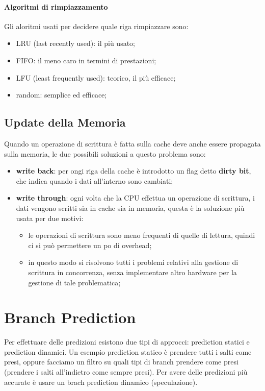 \documentclass[12pt]{article}
\begin{document}
\paragraph{Algoritmi di rimpiazzamento}
Gli aloritmi usati per decidere quale riga rimpiazzare sono:
\begin{itemize}
    \item LRU (last recently used): il pi\`u usato;
    \item FIFO: il meno caro in termini di prestazioni;
    \item LFU (least frequently used): teorico, il pi\`u efficace;
    \item random: semplice ed efficace;
\end{itemize}

\subsection{Update della Memoria}
Quando un operazione di scrittura \`e fatta sulla cache deve anche essere propagata sulla memoria, le due possibili soluzioni a questo problema sono:
\begin{itemize}
    \item \textbf{write back}: per ongi riga della cache \`e introdotto un flag detto \textbf{dirty bit}, che indica quando i dati all'interno sono cambiati;
    \item \textbf{write through}: ogni volta che la CPU effettua un operazione di scrittura, i dati vengono scritti sia in cache sia in memoria, questa \`e la soluzione pi\`u usata per due motivi:
        \begin{itemize}
            \item le operazioni di scrittura sono meno frequenti di quelle di lettura, quindi ci si pu\`o permettere un po di overhead;
            \item in questo modo si risolvono tutti i problemi relativi alla gestione di scrittura in concorrenza, senza implementare altro hardware per la gestione di tale problematica;
        \end{itemize}
\end{itemize}





\newpage
\section{Branch Prediction}
Per effettuare delle predizioni esistono due tipi di approcci: prediction statici e prediction dinamici. Un esempio prediction statico \`e prendere tutti i salti come presi, oppure facciamo un filtro su quali tipi di branch prendere come presi (prendere i salti all'indietro come sempre presi). Per avere delle predizioni pi\`u accurate \`e usare un brach prediction dinamico (speculazione).
\end{document}
